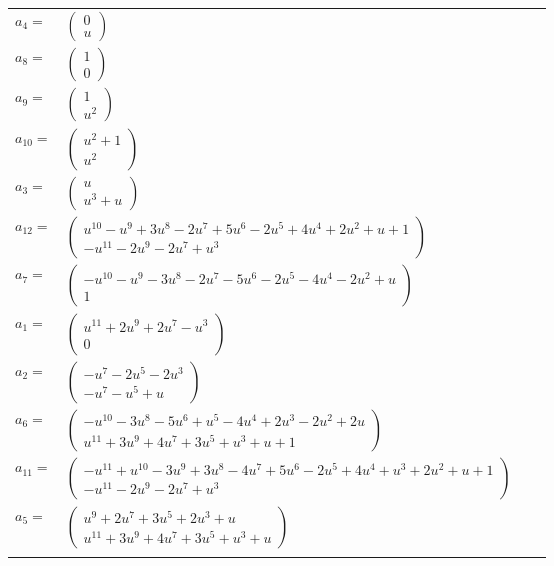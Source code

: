 \documentclass[1p]{elsarticle_modified}
\theoremstyle{definition}
\begin{document}
\begin{tabular}{m{7pt} m{180pt} m{7pt} m{180pt} }
\flushright $a_{4}=$&$\begin{pmatrix}0\\u\end{pmatrix}$ \\
\flushright $a_{8}=$&$\begin{pmatrix}1\\0\end{pmatrix}$ \\
\flushright $a_{9}=$&$\begin{pmatrix}1\\u^2\end{pmatrix}$ \\
\flushright $a_{10}=$&$\begin{pmatrix}u^2+1\\u^2\end{pmatrix}$ \\
\flushright $a_{3}=$&$\begin{pmatrix}u\\u^3+u\end{pmatrix}$ \\
\flushright $a_{12}=$&$\begin{pmatrix}u^{10}- u^9+3 u^8-2 u^7+5 u^6-2 u^5+4 u^4+2 u^2+u+1\\- u^{11}-2 u^9-2 u^7+u^3\end{pmatrix}$ \\
\flushright $a_{7}=$&$\begin{pmatrix}- u^{10}- u^9-3 u^8-2 u^7-5 u^6-2 u^5-4 u^4-2 u^2+u\\1\end{pmatrix}$ \\
\flushright $a_{1}=$&$\begin{pmatrix}u^{11}+2 u^9+2 u^7- u^3\\0\end{pmatrix}$ \\
\flushright $a_{2}=$&$\begin{pmatrix}- u^7-2 u^5-2 u^3\\- u^7- u^5+u\end{pmatrix}$ \\
\flushright $a_{6}=$&$\begin{pmatrix}- u^{10}-3 u^8-5 u^6+u^5-4 u^4+2 u^3-2 u^2+2 u\\u^{11}+3 u^9+4 u^7+3 u^5+u^3+u+1\end{pmatrix}$ \\
\flushright $a_{11}=$&$\begin{pmatrix}- u^{11}+u^{10}-3 u^9+3 u^8-4 u^7+5 u^6-2 u^5+4 u^4+u^3+2 u^2+u+1\\- u^{11}-2 u^9-2 u^7+u^3\end{pmatrix}$ \\
\flushright $a_{5}=$&$\begin{pmatrix}u^9+2 u^7+3 u^5+2 u^3+u\\u^{11}+3 u^9+4 u^7+3 u^5+u^3+u\end{pmatrix}$\\&\end{tabular}
\end{document}
